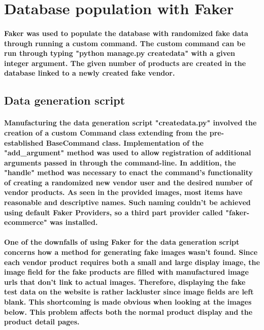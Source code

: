 \documentclass[sigconf]{acmart}
\begin{document}
\section{Database population with Faker}

\paragraph{ Faker was used to populate the database with randomized fake data through running a custom command. The custom command can be run through typing "python manage.py createdata" with a given integer argument. The given number of products are created in the database linked to a newly created fake vendor. }  

\subsection{Data generation script}

\paragraph{ Manufacturing the data generation script "createdata.py" involved the creation of a custom Command class extending from the pre-established BaseCommand class. Implementation of the "add\_argument" method was used to allow registration of additional arguments passed in through the command-line. In addition, the "handle" method was necessary to enact the command's functionality of creating a randomized new vendor user and the desired number of vendor products. As seen in the provided images, most items have reasonable and descriptive names. Such naming couldn't be achieved using default Faker Providers, so a third part provider called "faker-ecommerce" was installed. }     

\paragraph{ One of the downfalls of using Faker for the data generation script concerns how a method for generating fake images wasn't found. Since each vendor product requires both a small and large display image, the image field for the fake products are filled with manufactured image urls that don't link to actual images. Therefore, displaying the fake test data on the website is rather lackluster since image fields are left blank. This shortcoming is made obvious when looking at the images below. This problem affects both the normal product display and the product detail pages. }
\end{document}
